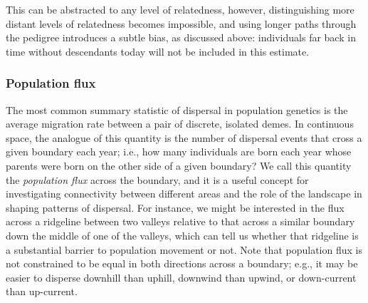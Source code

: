 \documentclass{ar-1col}
\newcommand{\plr}[1]{{\color{green}{#1}}}
\newcommand{\todo}[1]{{\textbf{\color{red}{#1}}}}
\begin{document}
This can be abstracted to any level of relatedness,
however, distinguishing more distant levels of relatedness becomes impossible,
and using longer paths through the pedigree introduces a subtle bias,
as discussed above:
individuals far back in time without descendants today
will not be included in this estimate.
\plr{discuss above}


\todo{tidy and conclude}



\subsubsection{Population flux}

The most common summary statistic of dispersal in population genetics
is the average migration rate between a pair of discrete, isolated demes.
In continuous space, the analogue of this quantity
is the number of dispersal events that cross
a given boundary each year;
i.e., how many individuals are born each year whose parents
were born on the other side of a given boundary?
We call this quantity the \textit{population flux} across the boundary,
and it is a useful concept for investigating connectivity between different areas
and the role of the landscape in shaping patterns of dispersal.
For instance,
we might be interested in the flux across a ridgeline between two valleys
relative to that across a similar boundary down the middle of one of the valleys,
which can tell us whether that ridgeline is a substantial barrier to population movement or not.
Note that population flux is not constrained to be equal in both directions across a boundary;
e.g., it may be easier to disperse downhill than uphill,
downwind than upwind,
or down-current than up-current.
\end{document}
